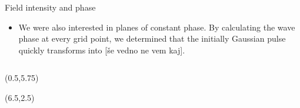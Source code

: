 \documentclass{beamer}
\newlength{\wideitemsep}
\let\olditem\item
\renewcommand{\item}{\setlength{\itemsep}{\wideitemsep}\olditem}
\newcommand{\blockpadding}{
  \rule[-0.6ex]{0pt}{2.5ex}
}
\begin{document}
\begin{columns}[t]
\begin{column}{0.596\textwidth}
\begin{block}{\blockpadding Field intensity and phase}
\begin{itemize}
 \item We were also interested in planes of constant phase. By calculating the wave phase at every grid point, we determined that the initially Gaussian pulse quickly transforms into [\v se vedno ne vem kaj]. 
\end{itemize}


\end{block}
 \end{column}

\end{columns}

\begin{textblock}{5.5}(0.5,5.75)
 

\end{textblock}

\begin{textblock}{8.5}(6.5,2.5)

\end{textblock}
\end{document}
